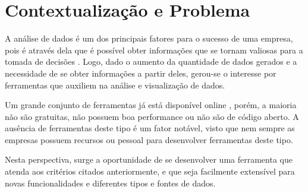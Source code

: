 \section{Contextualização e Problema}
  \label{subsec:contextualizacao-problema}

  A análise de dados é um dos principais fatores para o sucesso de uma empresa, pois é através dela que é possível obter informações que se tornam valiosas para a tomada de decisões \cite{angeloni2003elementos}. Logo, dado o aumento da quantidade de dados gerados e a necessidade de se obter informações a partir deles, gerou-se o interesse por ferramentas que auxiliem na análise e visualização de dados.

  Um grande conjunto de ferramentas já está disponível online \cite{stitchdata_2021}, porém, a maioria não são gratuitas, não possuem boa performance ou não são de código aberto. A ausência de ferramentas deste tipo é um fator notável, visto que nem sempre as empresas possuem recursos ou pessoal para desenvolver ferramentas deste tipo.

  Nesta perspectiva, surge a oportunidade de se desenvolver uma ferramenta que atenda aos critérios citados anteriormente, e que seja facilmente extensível para novas funcionalidades e diferentes tipos e fontes de dados.

